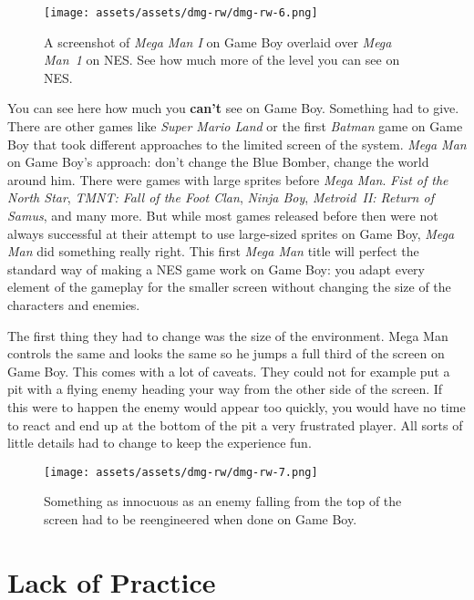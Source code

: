\documentclass{book}
\begin{document}
\begin{figure}[hbt]
\vskip 10pt
\centering \texttt{[image: assets/assets/dmg-rw/dmg-rw-6.png]}\par\pagetwodescription A screenshot of \emph{Mega Man I} on Game Boy overlaid over \emph{Mega Man~1} on NES. See how much more of the level you can see on NES.
\vskip 6pt
\end{figure}
You can see here how much you \textbf{can’t} see on Game Boy. Something had to give. There are other games like \emph{Super Mario Land} or the first \emph{Batman} game on Game Boy that took different approaches to the limited screen of the system. \emph{Mega Man} on Game Boy’s approach: don’t change the Blue Bomber, change the world around him. There were games with large sprites before \emph{Mega Man}. \emph{Fist of the North Star}, \emph{TMNT: Fall of the Foot Clan}, \emph{Ninja Boy}, \emph{Metroid~II: Return of Samus}, and many more. But while most games released before then were not always successful at their attempt to use large-sized sprites on Game Boy, \emph{Mega Man} did something really right. This first \emph{Mega Man} title will perfect the standard way of making a NES game work on Game Boy: you adapt every element of the gameplay for the smaller screen without changing the size of the characters and enemies.

The first thing they had to change was the size of the environment. Mega Man controls the same and looks the same so he jumps a full third of the screen on Game Boy. This comes with a lot of caveats. They could not for example put a pit with a flying enemy heading your way from the other side of the screen. If this were to happen the enemy would appear too quickly, you would have no time to react and end up at the bottom of the pit a very frustrated player. All sorts of little details had to change to keep the experience fun.

\begin{figure}[hbt]
\vskip 10pt
\centering \texttt{[image: assets/assets/dmg-rw/dmg-rw-7.png]}\par\pagetwodescription Something as innocuous as an enemy falling from the top of the screen had to be reengineered when done on Game Boy.
\vskip 6pt
\end{figure}

\FloatBarrier\needspace{10mm}\section*{Lack of Practice}\nopagebreak[4]
\end{document}

